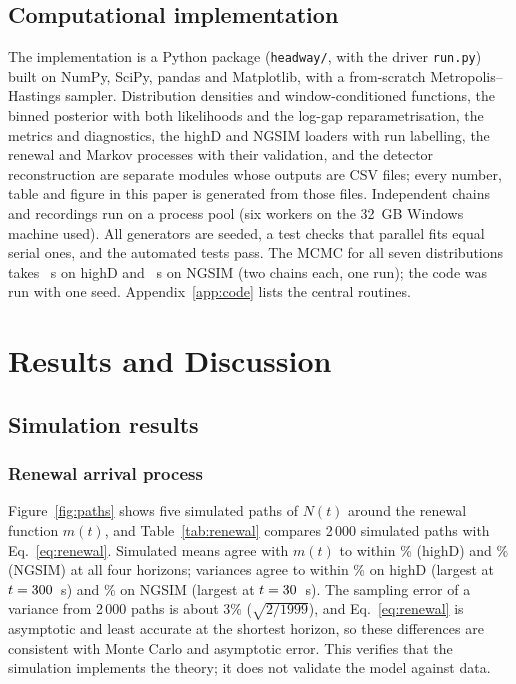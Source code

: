 \documentclass[10pt,a4paper]{article}
\numberwithin{equation}{section}
\begin{document}
\subsection{Computational implementation}\label{sec:impl}
The implementation is a Python package (\texttt{headway/}, with the driver \texttt{run.py}) built on NumPy, SciPy, pandas and Matplotlib, with a from-scratch Metropolis--Hastings sampler. Distribution densities and window-conditioned functions, the binned posterior with both likelihoods and the log-gap reparametrisation, the metrics and diagnostics, the highD and NGSIM loaders with run labelling,
the renewal and Markov processes with their validation, and the detector reconstruction are separate modules whose outputs are CSV files; every number, table and figure in this paper is generated from those files. Independent chains and recordings run on a process pool (six workers on the 32~GB Windows machine used).
All generators are seeded, a test checks that parallel fits equal serial ones, and the \nTests{} automated tests pass. The MCMC for all seven distributions takes \hdMcmcTime~s on highD and \ngMcmcTime~s on NGSIM (two chains each, one run); the code was run with one seed. Appendix~\ref{app:code} lists the central routines.

\section{Results and Discussion}\label{sec:results}

\subsection{Simulation results}\label{sec:sim}
\subsubsection{Renewal arrival process}
Figure~\ref{fig:paths} shows five simulated paths of $N(t)$ around the renewal function $m(t)$, and Table~\ref{tab:renewal} compares 2\,000 simulated paths with Eq.~\eqref{eq:renewal}. Simulated means agree with $m(t)$ to within \hdRenMeanMax\% (highD) and \ngRenMeanMax\% (NGSIM) at all four horizons;
variances agree to within \hdRenVarMax\% on highD (largest at $t=300$~s) and \ngRenVarMax\% on NGSIM (largest at $t=30$~s). The sampling error of a variance from 2\,000 paths is about 3\% ($\sqrt{2/1999}$), and Eq.~\eqref{eq:renewal} is asymptotic and least accurate at the shortest horizon, so these differences are consistent with Monte Carlo and asymptotic error.
This verifies that the simulation implements the theory; it does not validate the model against data.
\end{document}

